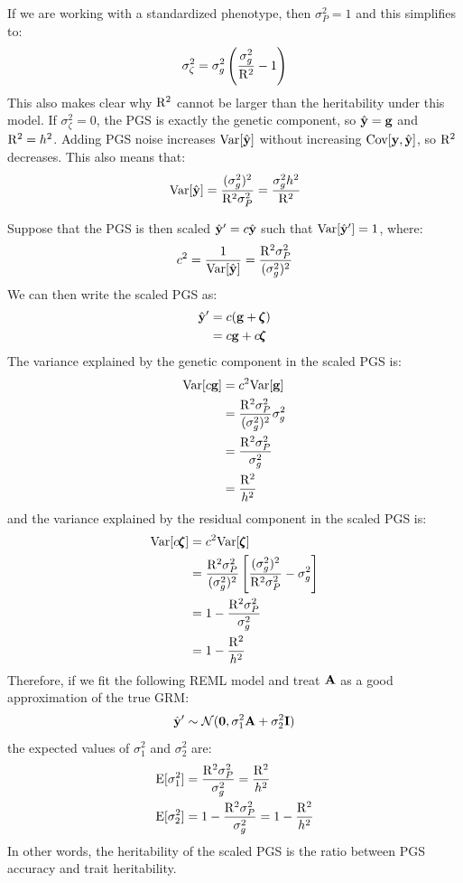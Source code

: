 \documentclass[12pt]{article}
\begin{document}
If we are working with a standardized phenotype, then $\sigma_P^2 = 1$ and this simplifies to:
$$\sigma_\zeta^2 = \sigma_g^2 \left(\frac{\sigma_g^2}{\mathrm{R}^2} - 1 \right) $$
This also makes clear why $\mathrm{R}^2$ cannot be larger than the heritability under this model.
If $\sigma_\zeta^2 = 0$, the PGS is exactly the genetic component, so $\hat{\mathbf{y}} = \mathbf{g}$ and $\mathrm{R}^2 = h^2$.
Adding PGS noise increases $\mathrm{Var}[\hat{\mathbf{y}}]$ without increasing $\mathrm{Cov}[\mathbf{y},\hat{\mathbf{y}}]$, so $\mathrm{R}^2$ decreases.
This also means that:
$$\mathrm{Var}[\hat{\mathbf{y}}] =
\frac{(\sigma_g^2)^2}{\mathrm{R}^2 \sigma_P^2} =
\frac{\sigma_g^2 h^2}{\mathrm{R}^2}$$

Suppose that the PGS is then scaled $\hat{\mathbf{y}}' = c\hat{\mathbf{y}}$ such that $\mathrm{Var}[\hat{\mathbf{y}}'] = 1$, where:
$$ c^2 = \frac{1}{\mathrm{Var}[\hat{\mathbf{y}}]} = \frac{\mathrm{R}^2 \sigma_P^2}{(\sigma_g^2)^2} $$
We can then write the scaled PGS as:
\begin{align*}
    \hat{\mathbf{y}}' &= c(\mathbf{g} + \pmb{\zeta}) \\
    &= c\mathbf{g} + c\pmb{\zeta}
\end{align*}
The variance explained by the genetic component in the scaled PGS is:
\begin{align*}
    \mathrm{Var}[c\mathbf{g}]
    &= c^2 \mathrm{Var}[\mathbf{g}] \\
    &= \frac{\mathrm{R}^2 \sigma_P^2}{(\sigma_g^2)^2} \sigma_g^2 \\
    &= \frac{\mathrm{R}^2 \sigma_P^2}{\sigma_g^2} \\
    &= \frac{\mathrm{R}^2}{h^2}
\end{align*}
and the variance explained by the residual component in the scaled PGS is:
\begin{align*}
    \mathrm{Var}[c\pmb{\zeta}]
    &= c^2 \mathrm{Var}[\pmb{\zeta}] \\
    &= \frac{\mathrm{R}^2 \sigma_P^2}{(\sigma_g^2)^2}
    \left[\frac{(\sigma_g^2)^2}{\mathrm{R}^2 \sigma_P^2} - \sigma_g^2\right] \\
    &= 1 - \frac{\mathrm{R}^2 \sigma_P^2}{\sigma_g^2} \\
    &= 1 - \frac{\mathrm{R}^2}{h^2}
\end{align*}
Therefore, if we fit the following REML model and treat $\mathbf{A}$ as a good approximation of the true GRM:
$$ \hat{\mathbf{y}}' \sim \mathcal{N}(\textbf{0}, \sigma^2_1 \mathbf{A} + \sigma^2_2 \mathbf{I}) $$
the expected values of $\sigma^2_1$ and $\sigma^2_2$ are:
\begin{align*}
    \mathrm{E}[\sigma^2_1] &= \frac{\mathrm{R}^2 \sigma_P^2}{\sigma_g^2} = \frac{\mathrm{R}^2}{h^2} \\
    \mathrm{E}[\sigma^2_2] &= 1 - \frac{\mathrm{R}^2 \sigma_P^2}{\sigma_g^2} = 1 - \frac{\mathrm{R}^2}{h^2}
\end{align*}
In other words, the heritability of the scaled PGS is the ratio between PGS accuracy and trait heritability.



\end{document}
